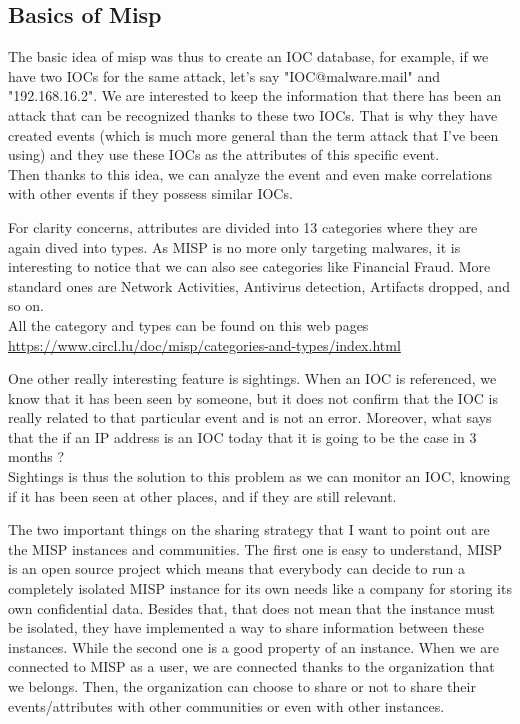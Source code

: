 \documentclass{eplmastersthesis}
\begin{document}
\subsection{Basics of Misp}
The basic idea of misp was thus to create an IOC database, for example, if we have two IOCs for the same attack, let's say "IOC@malware.mail" and "192.168.16.2". We are interested to  keep the information that there has been an attack that can be recognized thanks to these two IOCs. That is why they have created events (which is much more general than the term attack that I've been using) and they use these IOCs as the attributes of this specific event. \\
Then thanks to this idea, we can analyze the event and even make correlations with other events if they possess similar IOCs.

For clarity concerns, attributes are divided into 13 categories where they are again dived into types. As MISP is no more only targeting malwares, it is interesting to notice that we can also see categories like Financial Fraud. More standard ones are Network Activities, Antivirus detection, Artifacts dropped, and so on.\\
All the category and types can be found on this web pages \url{https://www.circl.lu/doc/misp/categories-and-types/index.html}

One other really interesting feature is sightings. When an IOC is referenced, we know that it has been seen by someone, but it does not confirm that the IOC is really related to that particular event and is not an error. Moreover, what says that the if an IP address is an IOC today that it is going to be the case in 3 months ? \\
Sightings is thus the solution to this problem as we can monitor an IOC, knowing if it has been seen at other places, and if they are still relevant.


The two important things on the sharing strategy that I want to point out are the MISP instances and communities. The first one is easy to understand, MISP is an open source project which means that everybody can decide to run a completely isolated MISP instance for its own needs like a company for storing its own confidential data. Besides that, that does not mean that the instance must be isolated, they have implemented a way to share information between these instances. While the second one is a good property of an instance. When we are connected to MISP as a user, we are connected thanks to the organization that we belongs. Then, the organization can choose to share or not to share their events/attributes with other communities or even with other instances. \\ 
\end{document}
